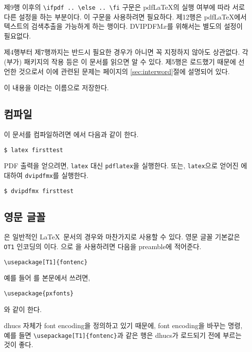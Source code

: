 제9행 이후의 \verb|\ifpdf .. \else .. \fi| 구문은 pdf\LaTeX 의
실행 여부에 따라 서로 다른 설정을 하는 부분이다. 이 구문을
사용하려면 \가 필요하다.
제12행은 pdf\LaTeX 에서 텍스트의 검색\cntrdot 추출을 가능하게
하는 행이다. DVIPDFM$x$를 위해서는 별도의 설정이 필요없다.

제4행부터 제7행까지는 반드시 필요한 경우가 아니면 꼭 지정하지 않아도 상관없다.
각 (부가) 패키지의 작용 등은 이 문서를 읽으면 알 수 있다.
제5행은 \를 로드했기 때문에 선언한
것으로서 이에 관련된 문제는 \pageref{sec:interword} 페이지의
\ref{sec:interword}절에 설명되어 있다. 

이 내용을 이라는 이름으로 저장한다.

\subsection{컴파일}

이 문서를 컴파일하려면 에서 다음과 같이 한다.
\begin{Verbatim}[fontsize=\small]
$ latex firsttest
\end{Verbatim}
PDF 출력을 얻으려면, \verb|latex| 대신 \verb|pdflatex|을 실행한다.
또는, \verb|latex|으로 얻어진 에 대하여 \verb|dvipdfmx|를
실행한다.
\begin{Verbatim}[fontsize=\small]
$ dvipdfmx firsttest
\end{Verbatim}

\subsection{영문 글꼴}
은 일반적인 \LaTeX\ 문서의 경우와 마찬가지로 사용할 수
있다.  영문 글꼴 기본값은 \texttt{OT1} 인코딩의 이다.
으로 을 사용하려면 다음을
preamble에 적어준다.
\begin{verbatim}
\usepackage[T1]{fontenc}
\end{verbatim}
예를 들어 를 본문에서 쓰려면,
\begin{verbatim}
\usepackage{pxfonts}
\end{verbatim}
와 같이 한다.

dhucs 자체가 font encoding을 정의하고 있기 때문에, font encoding을 바꾸는
명령, 예를 들면 \verb|\usepackage[T1]{fontenc}|과 같은 행은 dhucs가
로드되기 전에 부르는 것이 좋다.

